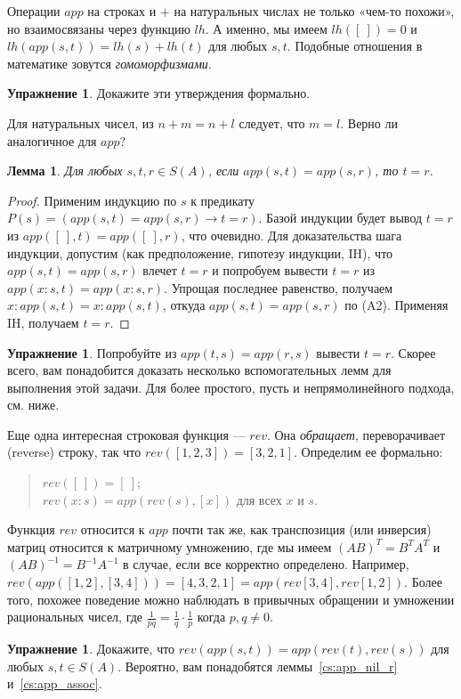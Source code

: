 \documentclass[12pt,notitlepage]{article}
\theoremstyle{plain}
\newtheorem{lemma}[thm]{Лемма}
\theoremstyle{definition}
\newtheorem{exc}[thm]{Упражнение}
\theoremstyle{plain}
\newcommand{\1}{\mathbf{1}}
\newcommand{\0}{\mathbf{0}}
\begin{document}
Операции $app$ на строках и $+$ на натуральных числах не только «чем-то похожи», но взаимосвязаны через функцию $lh$. А именно, мы имеем $lh([\ ]) = 0$ и $lh(app(s, t)) = lh(s) + lh(t)$ для любых $s, t$. Подобные отношения в математике зовутся \emph{гомоморфизмами}.
\begin{exc}
	Докажите эти утверждения формально.
\end{exc}

Для натуральных чисел, из $n + m = n + l$ следует, что $m = l$. Верно ли аналогичное для $app$?
\begin{lemma}\label{cs:app_inv_head}
	Для любых $s, t, r \in S(A)$, если $app(s,t) = app(s,r)$, то $t = r$.
\end{lemma}
\begin{proof}
	Применим индукцию по $s$ к предикату $P(s) = (app(s,t) = app(s,r) \to t = r)$. Базой индукции будет вывод $t = r$ из $app([\ ], t) = app([\ ], r)$, что очевидно. Для доказательства шага индукции, допустим (как предположение, гипотезу индукции, IH), что $app(s,t) = app(s,r)$ влечет $t = r$ и попробуем вывести $t = r$ из $app(x:s, t) = app(x:s, r)$. Упрощая последнее равенство, получаем $x : app(s,t) = x : app(s,t)$, откуда $app(s,t) = app(s,r)$ по (A2). Применяя IH, получаем $t = r$.
\end{proof}
\begin{exc}
	Попробуйте из $app(t,s) = app(r,s)$ вывести $t = r$. Скорее всего, вам понадобится доказать несколько вспомогательных лемм для выполнения этой задачи. Для более простого, пусть и непрямолинейного подхода, см. ниже.
\end{exc}

Еще одна интересная строковая функция --- $rev$. Она \emph{обращает}, переворачивает (reverse) строку, так что $rev([1,2,3]) = [3,2,1]$. Определим ее формально:
\begin{quote}
	$rev([\ ]) = [\ ]$;\\
	$rev(x : s) = app(rev(s), [x])$ для всех $x$ и $s$.
\end{quote}
Функция $rev$ относится к $app$ почти так же, как транспозиция (или инверсия) матриц относится к матричному умножению, где мы имеем $(AB)^T = B^T A^T$ и $(AB)^{-1} = B^{-1} A^{-1}$ в случае, если все корректно определено. Например, $rev(app([1,2], [3,4])) = [4,3,2,1] = app(rev[3,4], rev[1,2])$. Более того, похожее поведение можно наблюдать в привычных обращении и умножении рациональных чисел, где $\frac{1}{pq} = \frac{1}{q} \cdot \frac{1}{p}$ когда $p, q \neq 0$. 

\begin{exc}\label{cs:rev_app_distr}
	Докажите, что $rev(app(s,t)) = app(rev(t), rev(s))$ для любых $s, t \in S(A)$. Вероятно, вам понадобятся леммы~\ref{cs:app_nil_r} и~\ref{cs:app_assoc}.
\end{exc}
\end{document}
